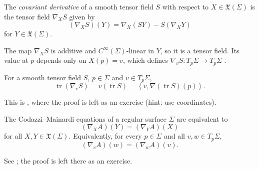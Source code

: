 \begin{definition}
\label{definition-alias-tensor-derivative}
The \emph{covariant derivative} of a
smooth tensor field $S$ with respect to
$X\in\mathfrak{X}(\Sigma)$ is the tensor
field $\nabla_XS$ given by
$$
(\nabla_XS)(Y)=\nabla_X(SY)
-S(\nabla_XY)
$$
for $Y\in\mathfrak{X}(\Sigma)$.
\end{definition}

The map $\nabla_XS$ is additive and
$C^\infty(\Sigma)$-linear in $Y$, so it is
a tensor field. Its value at $p$ depends
only on $X(p)=v$, which defines
$\nabla_vS:T_p\Sigma\to T_p\Sigma$
\cite[Definition 1.8,
p.~13]{alias2006analisis}.

\begin{proposition}
\label{proposition-alias-trace-commutes}
For a smooth tensor field $S$,
$p\in\Sigma$ and $v\in T_p\Sigma$,
$$
\operatorname{tr}(\nabla_vS)
=v(\operatorname{tr}S)
=\left\langle{} v,
\nabla(\operatorname{tr}S)(p)
\right\rangle{}.
$$
\end{proposition}

This is \cite[Proposition 1.9,
p.~13]{alias2006analisis}, where the
proof is left as an exercise (hint: use
coordinates).

\begin{theorem}
\label{theorem-alias-codazzi}
The Codazzi--Mainardi equations of a
regular surface $\Sigma$ are equivalent to
$$
(\nabla_XA)(Y)=(\nabla_YA)(X)
$$
for all $X,Y\in\mathfrak{X}(\Sigma)$.
Equivalently, for every $p\in\Sigma$ and
all $v,w\in T_p\Sigma$,
$$
(\nabla_vA)(w)=(\nabla_wA)(v).
$$
\end{theorem}

See \cite[Theorem 1.10,
pp.~13--14]{alias2006analisis}; the proof
is left there as an exercise.

